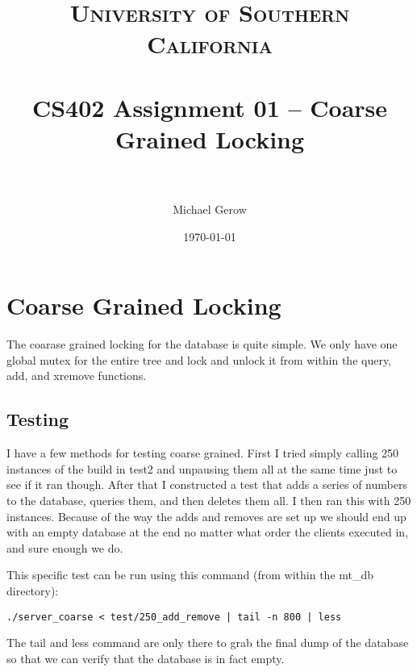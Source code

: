 \documentclass[paper=a4, fontsize=11pt]{scrartcl} %
\title{	
\normalfont \normalsize 
\textsc{University of Southern California} \\ [25pt] %
\horrule{0.5pt} \\[0.4cm] %
\huge CS402 Assignment 01 -- Coarse Grained Locking \\ %
\horrule{2pt} \\[0.5cm] %
}
\author{Michael Gerow} %
\date{\normalsize\today} %
\numberwithin{equation}{section} %
\numberwithin{figure}{section} %
\numberwithin{table}{section} %
\begin{document}
\maketitle %


\section{Coarse Grained Locking}
The coarase grained locking for the database is quite simple.  We only have one global mutex for the entire tree and lock and unlock it from within the query, add, and xremove functions.

\subsection{Testing}
I have a few methods for testing coarse grained.  First I tried simply calling 250 instances of the build in test2 and unpausing them all at the same time just to see if it ran though.  After that I constructed a test that adds a series of numbers to the database, queries them, and then deletes them all. I then ran this with 250 instances.  Because of the way the adds and removes are set up we should end up with an empty database at the end no matter what order the clients executed in, and sure enough we do.

This specific test can be run using this command (from within the mt\_db directory):

\begin{verbatim}
./server_coarse < test/250_add_remove | tail -n 800 | less
\end{verbatim}

The tail and less command are only there to grab the final dump of the database so that we can verify that the database is in fact empty.
\end{document}
